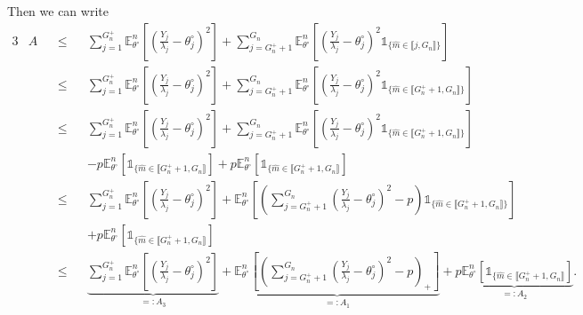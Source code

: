 Then we can write
\begin{alignat*}{3}
& A && \leq && \sum\limits_{j = 1}^{G_{n}^{+}} \mathds{E}_{\theta^{\circ}}^{n}\left[\left(\frac{Y_{j}}{\lambda_{j}} - \theta^{\circ}_{j}\right)^{2}\right] + \sum\limits_{j = G_{n}^{+} + 1}^{G_{n}} \mathds{E}_{\theta^{\circ}}^{n} \left[ \left(\frac{Y_{j}}{\lambda_{j}} - \theta^{\circ}_{j} \right)^{2} \mathds{1}_{\{\widehat{m} \in \llbracket j, G_{n} \rrbracket\}}\right]\\
& &&\leq&& \sum\limits_{j = 1}^{G_{n}^{+}} \mathds{E}_{\theta^{\circ}}^{n}\left[\left(\frac{Y_{j}}{\lambda_{j}} - \theta^{\circ}_{j}\right)^{2}\right] + \sum\limits_{j = G_{n}^{+} + 1}^{G_{n}} \mathds{E}_{\theta^{\circ}}^{n} \left[ \left(\frac{Y_{j}}{\lambda_{j}} - \theta^{\circ}_{j} \right)^{2} \mathds{1}_{\{\widehat{m} \in \llbracket G_{n}^{+}+1, G_{n} \rrbracket\}}\right]\\
& &&\leq&& \sum\limits_{j = 1}^{G_{n}^{+}} \mathds{E}_{\theta^{\circ}}^{n}\left[\left(\frac{Y_{j}}{\lambda_{j}} - \theta^{\circ}_{j}\right)^{2}\right] + \sum\limits_{j = G_{n}^{+} + 1}^{G_{n}} \mathds{E}_{\theta^{\circ}}^{n} \left[ \left(\frac{Y_{j}}{\lambda_{j}} - \theta^{\circ}_{j} \right)^{2} \mathds{1}_{\{\widehat{m} \in \llbracket G_{n}^{+}+1, G_{n} \rrbracket\}}\right] \\
& && && - p\mathds{E}_{\theta^{\circ}}^{n}\left[\mathds{1}_{\{\widehat{m} \in \llbracket G_{n}^{+}+1, G_{n} \rrbracket}\right] + p \mathds{E}_{\theta^{\circ}}^{n}\left[\mathds{1}_{\{\widehat{m} \in \llbracket G_{n}^{+}+1, G_{n} \rrbracket}\right]\\
& &&\leq&& \sum\limits_{j = 1}^{G_{n}^{+}} \mathds{E}_{\theta^{\circ}}^{n}\left[\left(\frac{Y_{j}}{\lambda_{j}} - \theta^{\circ}_{j}\right)^{2}\right] + \mathds{E}_{\theta^{\circ}}^{n} \left[ \left( \sum\limits_{j = G_{n}^{+} + 1}^{G_{n}}\left(\frac{Y_{j}}{\lambda_{j}} - \theta^{\circ}_{j} \right)^{2} - p\right) \mathds{1}_{\{\widehat{m} \in \llbracket G_{n}^{+}+1, G_{n} \rrbracket\}}\right]\\
& && &&+ p \mathds{E}_{\theta^{\circ}}^{n}\left[\mathds{1}_{\{\widehat{m} \in \llbracket G_{n}^{+}+1, G_{n} \rrbracket}\right]\\
& &&\leq&& \underbrace{\sum\limits_{j = 1}^{G_{n}^{+}} \mathds{E}_{\theta^{\circ}}^{n}\left[\left(\frac{Y_{j}}{\lambda_{j}} - \theta^{\circ}_{j}\right)^{2}\right]}_{=: A_{3}} + \underbrace{\mathds{E}_{\theta^{\circ}}^{n}\left[ \left(\sum\limits_{j = G_{n}^{+} + 1}^{G_{n}}\left(\frac{Y_{j}}{\lambda_{j}} - \theta^{\circ}_{j} \right)^{2} - p\right)_{+}\right]}_{=: A_{1}} + \underbrace{p \mathds{E}_{\theta^{\circ}}^{n}\left[\mathds{1}_{\{\widehat{m} \in \llbracket G_{n}^{+}+1, G_{n} \rrbracket}\right]}_{=: A_{2}} .
\end{alignat*}

